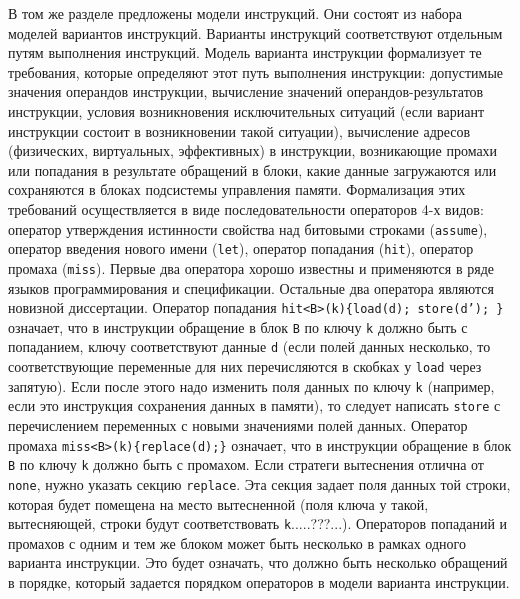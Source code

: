 \documentclass[14pt,autoref,href
,facsimile
]{disser}
\begin{document}
В том же разделе предложены модели инструкций. Они состоят из набора моделей вариантов инструкций. Варианты инструкций соответствуют отдельным путям выполнения инструкций. Модель варианта инструкции формализует те требования, которые определяют этот путь выполнения инструкции: допустимые значения операндов инструкции, вычисление значений операндов-результатов инструкции, условия возникновения исключительных ситуаций (если вариант инструкции состоит в возникновении такой ситуации), вычисление адресов (физических, виртуальных, эффективных) в инструкции, возникающие промахи или попадания в результате обращений в блоки, какие данные загружаются или сохраняются в блоках подсистемы управления памяти. Формализация этих требований осуществляется в виде последовательности операторов 4-х видов: оператор утверждения истинности свойства над битовыми строками (\texttt{assume}), оператор введения нового имени (\texttt{let}), оператор попадания (\texttt{hit}), оператор промаха (\texttt{miss}). Первые два оператора хорошо известны и применяются в ряде языков программирования и спецификации. Остальные два оператора являются новизной диссертации. Оператор попадания \texttt{hit<B>(k)\{load(d); store(d'); \}} означает, что в инструкции обращение в блок \texttt{B} по ключу \texttt{k} должно быть с попаданием, ключу соответствуют данные \texttt{d} (если полей данных несколько, то соответствующие переменные для них перечисляются в скобках у \texttt{load} через запятую). Если после этого надо изменить поля данных по ключу \texttt{k} (например, если это инструкция сохранения данных в памяти), то следует написать \texttt{store} с перечислением переменных с новыми значениями полей данных. Оператор промаха \texttt{miss<B>(k)\{replace(d);\}} означает, что в инструкции обращение в блок \texttt{B} по ключу \texttt{k} должно быть с промахом. Если стратеги вытеснения отлична от \texttt{none}, нужно указать секцию \texttt{replace}. Эта секция задает поля данных той строки, которая будет помещена на место вытесненной (поля ключа у такой, вытесняющей, строки будут соответствовать \texttt{k}.....???...). Операторов попаданий и промахов с одним и тем же блоком может быть несколько в рамках одного варианта инструкции. Это будет означать, что должно быть несколько обращений в порядке, который задается порядком операторов в модели варианта инструкции. 
\end{document}
